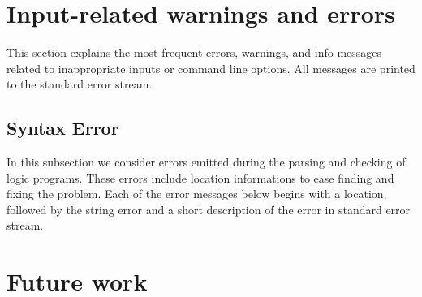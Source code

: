 \documentclass[a4paper, titlepage]{article}
\begin{document}
\section{Input-related warnings and errors}
\label{sec:inputRelatedWarnings}
This section explains the most frequent errors, warnings, and info messages related
to inappropriate inputs or command line options. All messages are printed to the
standard error stream.

\subsection{Syntax Error}
In this subsection we consider errors emitted during the parsing and checking of logic programs.
These errors include location informations to ease finding and fixing the problem. Each of the error messages below
begins with a location, followed by the string error and a short description of the error in standard error stream.





\section{Future work}
\label{sec:future}

\newpage


\end{document}
